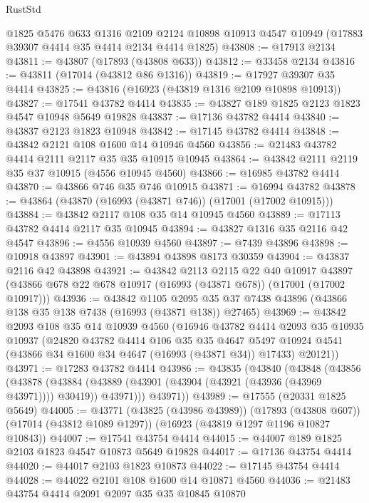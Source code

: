 \begin{lexlean}{RustStd}
\begin{coremodule}
    @1825
    @5476
    @633
    @1316
    @2109
    @2124
    @10898
    @10913
    @4547
    @10949
    (@17883 @39307 @4414 @35 @4414 @2134 @4414 @1825)
@43808 := @17913 @2134
@43811 := @43807 (@17893 (@43808 @633))
@43812 := @33458 @2134
@43816 := @43811 (@17014 (@43812 @86 @1316))
@43819 := @17927 @39307 @35 @4414
@43825 := @43816 (@16923 (@43819 @1316 @2109 @10898 @10913))
@43827 := @17541 @43782 @4414
@43835 := @43827 @189 @1825 @2123 @1823 @4547 @10948 @5649 @19828
@43837 := @17136 @43782 @4414
@43840 := @43837 @2123 @1823 @10948
@43842 := @17145 @43782 @4414
@43848 := @43842 @2121 @108 @1600 @14 @10946 @4560
@43856 := @21483 @43782 @4414 @2111 @2117 @35 @35 @10915 @10945
@43864 := @43842 @2111 @2119 @35 @37 @10915 (@4556 @10945 @4560)
@43866 := @16985 @43782 @4414
@43870 := @43866 @746 @35 @746 @10915
@43871 := @16994 @43782
@43878 := @43864 (@43870 (@16993 (@43871 @746)) (@17001 (@17002 @10915)))
@43884 := @43842 @2117 @108 @35 @14 @10945 @4560
@43889 := @17113 @43782 @4414 @2117 @35 @10945
@43894 := @43827 @1316 @35 @2116 @42 @4547
@43896 := @4556 @10939 @4560
@43897 := @7439 @43896
@43898 := @10918 @43897
@43901 := @43894 @43898 @8173 @30359
@43904 := @43837 @2116 @42 @43898
@43921 := @43842
    @2113
    @2115
    @22
    @40
    @10917
    @43897
    (@43866 @678 @22 @678 @10917 (@16993 (@43871 @678)) (@17001 (@17002 @10917)))
@43936 := @43842
    @1105
    @2095
    @35
    @37
    @7438
    @43896
    (@43866 @138 @35 @138 @7438 (@16993 (@43871 @138)) @27465)
@43969 := @43842
    @2093
    @108
    @35
    @14
    @10939
    @4560
    (@16946
      @43782
      @4414
      @2093
      @35
      @10935
      @10937
      (@24820
        @43782
        @4414
        @106
        @35
        @35
        @4647
        @5497
        @10924
        @4541
        (@43866 @34 @1600 @34 @4647 (@16993 (@43871 @34)) @17433)
        @20121))
@43971 := @17283 @43782 @4414
@43986 := @43835
    (@43840
      (@43848
        (@43856
          (@43878
            (@43884 (@43889 (@43901 (@43904 (@43921 (@43936 (@43969 @43971)))) @30419)) @43971)))
        @43971))
@43989 := @17555 (@20331 @1825 @5649)
@44005 := @43771
    (@43825 (@43986 @43989))
    (@17893 (@43808 @607))
    (@17014 (@43812 @1089 @1297))
    (@16923 (@43819 @1297 @1196 @10827 @10843))
@44007 := @17541 @43754 @4414
@44015 := @44007 @189 @1825 @2103 @1823 @4547 @10873 @5649 @19828
@44017 := @17136 @43754 @4414
@44020 := @44017 @2103 @1823 @10873
@44022 := @17145 @43754 @4414
@44028 := @44022 @2101 @108 @1600 @14 @10871 @4560
@44036 := @21483 @43754 @4414 @2091 @2097 @35 @35 @10845 @10870

\end{coremodule}
\end{lexlean}
